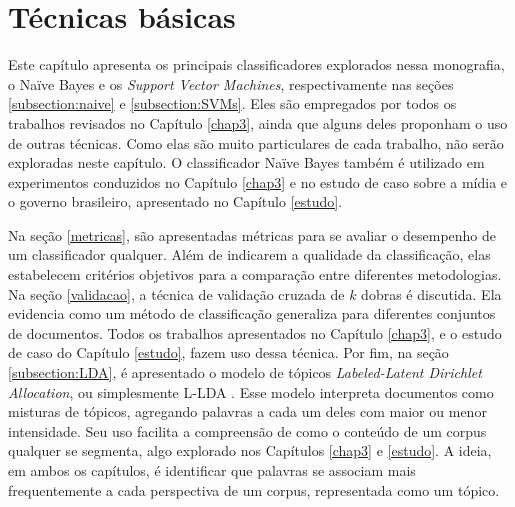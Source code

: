 \chapter{Técnicas básicas}
\label{basicos}

Este capítulo apresenta os principais classificadores explorados nessa monografia, o Naïve Bayes e os \emph{Support Vector Machines}, respectivamente nas seções \ref{subsection:naive} e \ref{subsection:SVMs}. Eles são empregados por todos os trabalhos revisados no Capítulo \ref{chap3}, ainda que alguns deles proponham o uso de outras técnicas. Como elas são muito particulares de cada trabalho, não serão exploradas neste capítulo. O classificador Naïve Bayes também é utilizado em experimentos conduzidos no Capítulo \ref{chap3} e no estudo de caso sobre a mídia e o governo brasileiro, apresentado no Capítulo \ref{estudo}. 


Na seção \ref{metricas}, são apresentadas métricas para se avaliar o desempenho de um classificador qualquer. Além de indicarem a qualidade da classificação, elas estabelecem critérios objetivos para a comparação entre diferentes metodologias. Na seção \ref{validacao}, a técnica de validação cruzada de \ensuremath{k} dobras é discutida. Ela evidencia como um método de classificação generaliza para diferentes conjuntos de documentos. Todos os trabalhos apresentados no Capítulo \ref{chap3}, e o estudo de caso do Capítulo \ref{estudo}, fazem uso dessa técnica. Por fim, na seção \ref{subsection:LDA}, é apresentado o modelo de tópicos \emph{Labeled-Latent Dirichlet Allocation}, ou simplesmente L-LDA \cite{llda}. Esse modelo interpreta documentos como misturas de tópicos, agregando palavras a cada um deles com maior ou menor intensidade. Seu uso facilita a compreensão de como o conteúdo de um corpus qualquer se segmenta, algo explorado nos Capítulos \ref{chap3} e \ref{estudo}. A ideia, em ambos os capítulos, é identificar que palavras se associam mais frequentemente a cada perspectiva de um corpus, representada como um tópico. 



